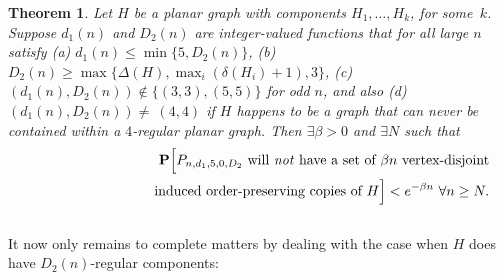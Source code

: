 \documentclass{article}
\newtheorem{Theorem}{Theorem}
\newtheorem{Proof of Theorem}{Proof of Theorem}
\begin{document}
\begin{Theorem} \label{bounded1001}
Let $H$ be a planar graph with components $H_{1}, \ldots, H_{k}$, for some~$k$.
Suppose $d_{1}(n)$ and $D_{2}(n)$ are integer-valued functions that for all large $n$ satisfy
(a) $d_{1}(n) \leq \min \{ 5, D_{2}(n) \}$,
(b) $D_{2}(n) \geq \max \{ \Delta(H), \max_{i} (\delta(H_{i})+1), 3 \}$,
(c)~$(d_{1}(n),D_{2}(n)) \!\notin\! \{ (3,3),(5,5) \}$ for odd $n$,
and also (d) $(d_{1}(n),D_{2}(n)) \!\neq~\!\!(4,4)$ 
if $H$ happens to be a graph that can never be contained within a $4$-regular planar graph.
Then $\exists \beta > 0$ and $\exists N$ such that
\begin{eqnarray*}
& & \mathbf{P} \Big[
\textrm{$P_{n,d_{1},5,0,D_{2}}$
will \emph{not} have a set of $\beta n$ vertex-disjoint} \\
& & \phantom{wwwwwwwwwwq}\textrm{induced order-preserving copies of $H$}\Big] 
< e^{- \beta n}~
\forall n \geq N. 
\end{eqnarray*}
\end{Theorem}















\begin{displaymath}
\end{displaymath}















It now only remains to complete matters by dealing with the case when $H$ does have $D_{2}(n)$-regular components:
\end{document}
